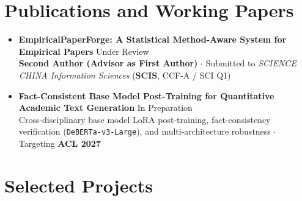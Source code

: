 \documentclass[10pt,letterpaper]{article}
\begin{document}
\section{Publications and Working Papers}

\begin{itemize}[leftmargin=10pt]
  \item \textbf{EmpiricalPaperForge: A Statistical Method-Aware System for Empirical Papers} \hfill Under Review \\
  \textbf{Second Author (Advisor as First Author)} $\cdot$ Submitted to \emph{SCIENCE CHINA Information Sciences} (\textbf{SCIS}, CCF-A / SCI Q1)
  \item \textbf{Fact-Consistent Base Model Post-Training for Quantitative Academic Text Generation} \hfill In Preparation \\
  Cross-disciplinary base model LoRA post-training, fact-consistency verification (\texttt{DeBERTa-v3-Large}), and multi-architecture robustness $\cdot$ Targeting \textbf{ACL 2027}
\end{itemize}

\section{Selected Projects}
\end{document}
